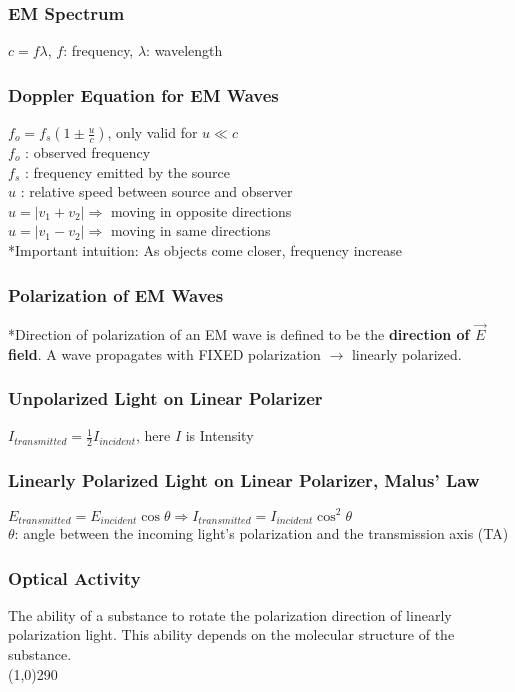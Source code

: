 \documentclass[10 pt]{article}
\begin{document}
\begin{multicols}{2}
\subsubsection*{EM Spectrum}
$c = f\lambda$, $f$: frequency, $\lambda$: wavelength
\subsubsection*{Doppler Equation for EM Waves}
$f_{o} = f_{s} (1 \pm \frac{u}{c})$, only valid for $u \ll c$ \\
$f_{o}$ : observed frequency \\
$f_{s}$ : frequency emitted by the source \\
$u$ : relative speed between source and observer \\
$u = |v_{1}+v_{2}| \Rightarrow$ moving in opposite directions \\
$u = |v_{1}-v_{2}| \Rightarrow$ moving in same directions \\
*Important intuition: As objects come closer, frequency increase
\subsubsection*{Polarization of EM Waves}
*Direction of polarization of an EM wave is defined to be the \textbf{direction of $\vec{E}$ field}. A wave propagates with FIXED polarization $\rightarrow$ linearly polarized.
\subsubsection*{Unpolarized Light on Linear Polarizer}
$I_{transmitted} = \frac{1}{2} I_{incident}$, here $I$ is Intensity
\subsubsection*{Linearly Polarized Light on Linear Polarizer, Malus' Law}
$E_{transmitted} = E_{incident}\cos{\theta} \Rightarrow I_{transmitted} = I_{incident} \cos^{2}{\theta}$ \\
$\theta$: angle between the incoming light's polarization and the transmission axis (TA)
\subsubsection*{Optical Activity}
The ability of a substance to rotate the polarization direction of linearly polarization light. This ability depends on the molecular structure of the substance.\\
\line(1,0){290}

\end{multicols}
\end{document}
